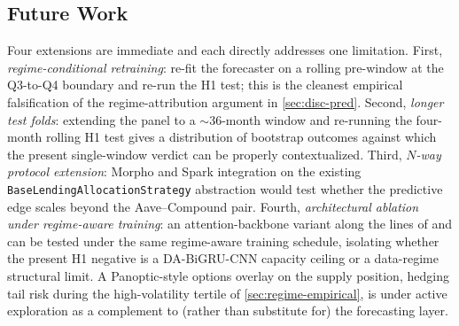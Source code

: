 \subsection{Future Work}
\label{sec:future}

Four extensions are immediate and each directly addresses one
limitation. First, \emph{regime-conditional retraining}: re-fit the
forecaster on a rolling pre-window at the Q3-to-Q4 boundary and
re-run the H1 test; this is the cleanest empirical falsification
of the regime-attribution argument in \cref{sec:disc-pred}.
Second, \emph{longer test folds}: extending the panel to a
$\sim$36-month window and re-running the four-month rolling H1
test gives a distribution of bootstrap outcomes against which the
present single-window verdict can be properly contextualized.
Third, \emph{$N$-way protocol extension}: Morpho and Spark
integration on the existing \texttt{BaseLendingAllocationStrategy}
abstraction would test whether the predictive edge scales beyond
the Aave--Compound pair. Fourth, \emph{architectural ablation
under regime-aware training}: an attention-backbone variant along
the lines of \cite{wallbridge2020transformerlob} and
\cite{nunes2026lstm} can be tested under the same regime-aware
training schedule, isolating whether the present H1 negative is a
DA-BiGRU-CNN capacity ceiling or a data-regime structural limit. A
Panoptic-style options overlay on the supply position, hedging
tail risk during the high-volatility tertile of
\cref{sec:regime-empirical}, is under active exploration as a
complement to (rather than substitute for) the forecasting layer.
